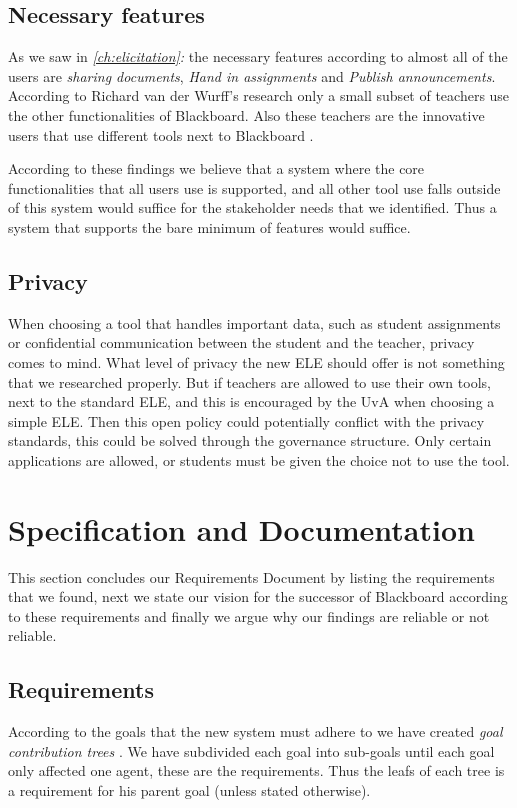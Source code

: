 \section{Necessary features}
As we saw in \emph{\ref{ch:elicitation}: } the necessary features according to almost all of the users are \emph{sharing documents}, \emph{Hand in assignments} and \emph{Publish announcements}. According to Richard van der Wurff's research only a small subset of teachers use the other functionalities of Blackboard. Also these teachers are the innovative users that use different tools next to Blackboard \cite{richard_report}. 

According to these findings we believe that a system where the core functionalities that all users use is supported, and all other tool use falls outside of this system would suffice for the stakeholder needs that we identified. Thus a system that supports the bare minimum of features would suffice.

\section{Privacy}
When choosing a tool that handles important data, such as student assignments or confidential communication between the student and the teacher, privacy comes to mind. What level of privacy the new ELE should offer is not something that we researched properly. But if teachers are allowed to use their own tools, next to the standard ELE, and this is encouraged by the UvA when choosing a simple ELE. Then this open policy could potentially conflict with the privacy standards, this could be solved through the governance structure. Only certain applications are allowed, or students must be given the choice not to use the tool.

\chapter{Specification and Documentation}
This section concludes our Requirements Document by listing the requirements that we found, next we state our vision for the successor of Blackboard according to these requirements and finally we argue why our findings are reliable or not reliable.

\section{Requirements}
According to the goals that the new system must adhere to we have created \emph{goal contribution trees} \cite{RE_book}. We have subdivided each goal into sub-goals until each goal only affected one agent, these are the requirements. Thus the leafs of each tree is a requirement for his parent goal (unless stated otherwise).

